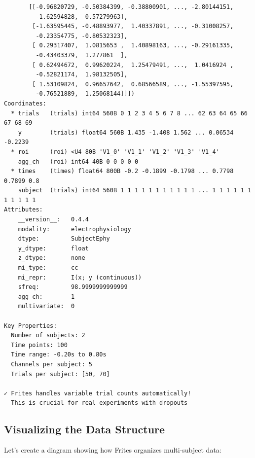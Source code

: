 \documentclass[
  11pt,
  letterpaper,
  oneside,
  openany]{book}
\begin{document}
\begin{verbatim}
       [[-0.96820729, -0.50384399, -0.38800901, ..., -2.80144151,
         -1.62594828,  0.57279963],
        [-1.63595445, -0.48893977,  1.40337891, ..., -0.31008257,
         -0.23354775, -0.80532323],
        [ 0.29317407,  1.0815653 ,  1.40898163, ..., -0.29161335,
         -0.43403379,  1.277861  ],
        [ 0.62494672,  0.99620224,  1.25479491, ...,  1.0416924 ,
         -0.52821174,  1.98132505],
        [ 1.53109824,  0.96657642,  0.68566589, ..., -1.55397595,
         -0.76521889,  1.25068144]]])
Coordinates:
  * trials   (trials) int64 560B 0 1 2 3 4 5 6 7 8 ... 62 63 64 65 66 67 68 69
    y        (trials) float64 560B 1.435 -1.408 1.562 ... 0.06534 -0.2239
  * roi      (roi) <U4 80B 'V1_0' 'V1_1' 'V1_2' 'V1_3' 'V1_4'
    agg_ch   (roi) int64 40B 0 0 0 0 0
  * times    (times) float64 800B -0.2 -0.1899 -0.1798 ... 0.7798 0.7899 0.8
    subject  (trials) int64 560B 1 1 1 1 1 1 1 1 1 1 1 ... 1 1 1 1 1 1 1 1 1 1 1
Attributes:
    __version__:   0.4.4
    modality:      electrophysiology
    dtype:         SubjectEphy
    y_dtype:       float
    z_dtype:       none
    mi_type:       cc
    mi_repr:       I(x; y (continuous))
    sfreq:         98.9999999999999
    agg_ch:        1
    multivariate:  0

Key Properties:
  Number of subjects: 2
  Time points: 100
  Time range: -0.20s to 0.80s
  Channels per subject: 5
  Trials per subject: [50, 70]

✓ Frites handles variable trial counts automatically!
  This is crucial for real experiments with dropouts
\end{verbatim}

\subsection{Visualizing the Data
Structure}\label{visualizing-the-data-structure}

Let's create a diagram showing how Frites organizes multi-subject data:
\end{document}
